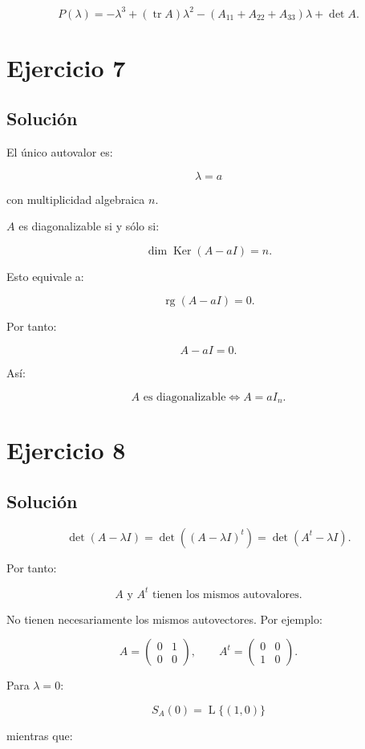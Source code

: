 \documentclass[11pt,a4paper]{article}
\newcommand{\Ker}{\operatorname{Ker}}
\newcommand{\rg}{\operatorname{rg}}
\newcommand{\tr}{\operatorname{tr}}
\newcommand{\Span}{\operatorname{L}}
\begin{document}
\[
\boxed{
P(\lambda)
=
-\lambda^3
+
(\tr A)\lambda^2
-
(A_{11}+A_{22}+A_{33})\lambda
+
\det A.
}
\]

\section{Ejercicio 7}
\subsection{Solución}

El único autovalor es:

\[
\lambda=a
\]

con multiplicidad algebraica $n$.

$A$ es diagonalizable si y sólo si:

\[
\dim\Ker(A-aI)=n.
\]

Esto equivale a:

\[
\rg(A-aI)=0.
\]

Por tanto:

\[
A-aI=0.
\]

Así:

\[
\boxed{
A\text{ es diagonalizable}
\iff
A=aI_n.
}
\]

\section{Ejercicio 8}
\subsection{Solución}

\[
\det(A-\lambda I)
=
\det((A-\lambda I)^t)
=
\det(A^t-\lambda I).
\]

Por tanto:

\[
\boxed{
A\text{ y }A^t\text{ tienen los mismos autovalores.}
}
\]

No tienen necesariamente los mismos autovectores. Por ejemplo:

\[
A=
\begin{pmatrix}
0&1\\
0&0
\end{pmatrix},
\qquad
A^t=
\begin{pmatrix}
0&0\\
1&0
\end{pmatrix}.
\]

Para $\lambda=0$:

\[
S_A(0)=\Span\{(1,0)\}
\]

mientras que:
\end{document}
